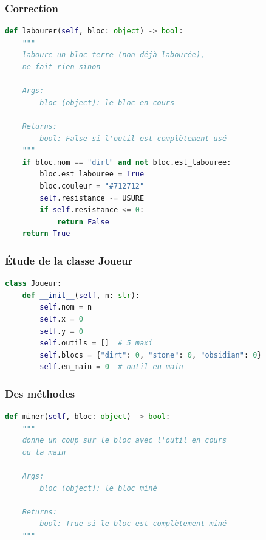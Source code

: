 \documentclass[svgnames,11pt]{beamer}
\begin{document}
\begin{frame}[fragile]
    \frametitle{Correction}

\begin{center}
\begin{lstlisting}[language=Python , basicstyle=\small, xleftmargin=2em, xrightmargin=2em]
def labourer(self, bloc: object) -> bool:
    """
    laboure un bloc terre (non déjà labourée), 
    ne fait rien sinon

    Args:
        bloc (object): le bloc en cours

    Returns:
        bool: False si l'outil est complètement usé
    """
    if bloc.nom == "dirt" and not bloc.est_labouree:
        bloc.est_labouree = True
        bloc.couleur = "#712712"
        self.resistance -= USURE
        if self.resistance <= 0:
            return False
    return True
\end{lstlisting}
\end{center}

\end{frame}
\begin{frame}[fragile]
    \frametitle{Étude de la classe Joueur}

    \begin{center}
    \begin{lstlisting}[language=Python , basicstyle=\small, xleftmargin=2em, xrightmargin=2em]
class Joueur:
    def __init__(self, n: str):
        self.nom = n
        self.x = 0
        self.y = 0
        self.outils = []  # 5 maxi
        self.blocs = {"dirt": 0, "stone": 0, "obsidian": 0}
        self.en_main = 0  # outil en main
\end{lstlisting}
    \label{CODE}
    \end{center}
\end{frame}
\begin{frame}[fragile]
    \frametitle{Des méthodes}

\begin{center}
\begin{lstlisting}[language=Python , basicstyle=\small, xleftmargin=2em, xrightmargin=2em]
def miner(self, bloc: object) -> bool:
    """
    donne un coup sur le bloc avec l'outil en cours
    ou la main

    Args:
        bloc (object): le bloc miné

    Returns:
        bool: True si le bloc est complètement miné
    """
\end{lstlisting}
\label{CODE}
\end{center}

\end{frame}
\end{document}
